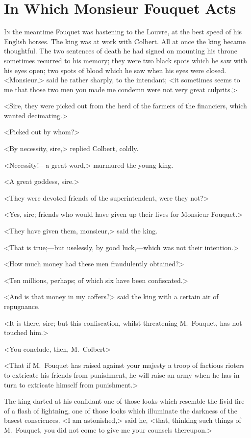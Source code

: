 \chapter{In Which Monsieur Fouquet Acts}

\lettrine{I}{n} the meantime Fouquet was hastening to the Louvre, at the best speed of his English horses. The king was at work with Colbert. All at once the king became thoughtful. The two sentences of death he had signed on mounting his throne sometimes recurred to his memory; they were two black spots which he saw with his eyes open; two spots of blood which he saw when his eyes were closed. <Monsieur,> said he rather sharply, to the intendant; <it sometimes seems to me that those two men you made me condemn were not very great culprits.>

<Sire, they were picked out from the herd of the farmers of the financiers, which wanted decimating.>

<Picked out by whom?>

<By necessity, sire,> replied Colbert, coldly.

<Necessity!—a great word,> murmured the young king.

<A great goddess, sire.>

<They were devoted friends of the superintendent, were they not?>

<Yes, sire; friends who would have given up their lives for Monsieur Fouquet.>

<They have given them, monsieur,> said the king.

<That is true;—but uselessly, by good luck,—which was not their intention.>

<How much money had these men fraudulently obtained?>

<Ten millions, perhaps; of which six have been confiscated.>

<And is that money in my coffers?> said the king with a certain air of repugnance.

<It is there, sire; but this confiscation, whilst threatening M.~Fouquet, has not touched him.>

<You conclude, then, M.~Colbert\longdash>

<That if M.~Fouquet has raised against your majesty a troop of factious rioters to extricate his friends from punishment, he will raise an army when he has in turn to extricate himself from punishment.>

The king darted at his confidant one of those looks which resemble the livid fire of a flash of lightning, one of those looks which illuminate the darkness of the basest consciences. <I am astonished,> said he, <that, thinking such things of M.~Fouquet, you did not come to give me your counsels thereupon.>

